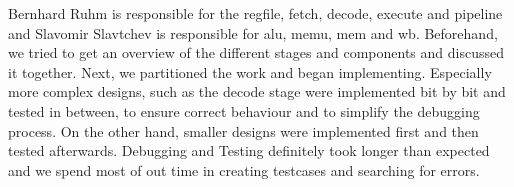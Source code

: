 \documentclass[11pt,a4paper,titlepage,oneside]{article}
\begin{document}
Bernhard Ruhm is responsible for the regfile, fetch, decode, execute and pipeline and Slavomir Slavtchev is responsible for alu, memu, mem and wb.
Beforehand, we tried to get an overview of the different stages and components and discussed it together. Next, we partitioned the work and began implementing.
Especially more complex designs, such as the decode stage were implemented bit by bit and tested in between, to ensure correct behaviour and to simplify the debugging process.
On the other hand, smaller designs were implemented first and then tested afterwards. Debugging and Testing definitely took longer than expected and we spend most of out time 
in creating testcases and searching for errors.
\end{document}
